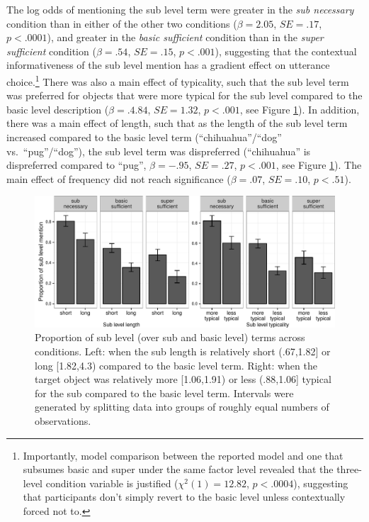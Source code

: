 \documentclass[11pt]{article}
\newcommand{\figref}[1]{Figure \ref{#1}}
\begin{document}
The log odds of mentioning the sub level term were greater in the \emph{sub necessary} condition than in either of the other two conditions ($\beta = 2.05$, $SE = .17$, $p < .0001$), and greater in the \emph{basic sufficient} condition than in the \emph{super sufficient} condition ($\beta = .54$, $SE = .15$, $p < .001$), suggesting that the contextual informativeness of the sub level mention has a gradient effect on utterance choice.\footnote{Importantly, model comparison between the reported model and one that subsumes basic and super under the same factor level revealed that the three-level condition variable is justified ($\chi ^2 (1) = 12.82$, $p < .0004$), suggesting that participants don't simply revert to the basic level unless contextually forced not to.} There was also a main effect of typicality, such that the sub level term was preferred for objects that were more typical for the sub level compared to the basic level  description ($\beta = .4.84$, $SE = 1.32$, $p < .001$, see \figref{fig:exp2effects}). In addition, there was a main effect of length, such that as the length of the sub level term increased compared to the basic level term (``chihuahua''/``dog'' vs.~``pug''/``dog''), the sub level term was dispreferred (``chihuahua'' is dispreferred compared to ``pug'', $\beta = -.95$, $SE = .27$, $p < .001$, see \figref{fig:exp2effects}). The main effect of frequency did not reach significance ($\beta = .07$, $SE = .10$, $p < .51$).

\begin{figure}
\centering
\includegraphics[width=\textwidth]{pics/lengthtypicality}
\caption{Proportion of sub level (over sub and basic level) terms across conditions. Left: when the sub  length is relatively short (.67,1.82] or long [1.82,4.3) compared to the basic level term. Right: when the target object was relatively more [1.06,1.91) or less (.88,1.06] typical for the sub compared to the basic level term. Intervals were generated by splitting data into groups of roughly equal numbers of observations.}
\label{fig:exp2effects}
\end{figure}
\end{document}
